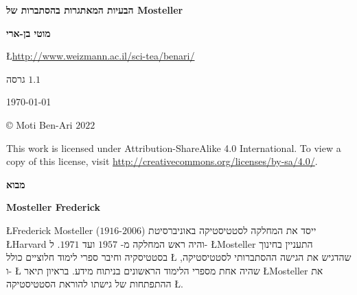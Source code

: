 


\thispagestyle{empty}

\begin{center}
\textbf{\LARGE הבעיות המאתגרות בהסתברות של Mosteller}

\bigskip
\bigskip
\bigskip

\textbf{\Large מוטי בן-ארי}

\bigskip

\L{\url{http://www.weizmann.ac.il/sci-tea/benari/}}

\bigskip
\bigskip
\bigskip

 גרסה
$1.1$

\bigskip

\today

\end{center}

\vfill

\begin{center}
\copyright{} Moti Ben-Ari $2022$
 \end{center}
 
\begin{small}
This work is licensed under Attribution-ShareAlike 4.0 International. To view a copy of this license, visit \url{http://creativecommons.org/licenses/by-sa/4.0/}.
\end{small}
\newpage


\tableofcontents

\newpage

\begin{center}
\textbf{\LARGE מבוא}
\end{center}


\bigskip

\textbf{Mosteller Frederick}

\L{Frederick Mosteller}
($1916$-$2006$)
ייסד את המחלקה לסטטיסטיקה באוניברסיטת 
\L{Harvard}
והיה ראש המחלקה מ-%
$1957$
ועד
$1971$.
ל-%
\L{Mosteller}
התעניין בחינוך בסטטיסקיה וחיבר ספרי לימוד חלוציים כולל 
\L{\cite{pwsa}}
שהדגיש את הגישה ההסתברותי לסטטיסטיקה, ו-%
\L{\cite{bsda}}
שהיה אחת מספרי הלימוד הראשונים בניתוח מידע. בראיון תיאר 
\L{Mosteller}
את ההתפתחות של גישתו להוראת הסטטיסטיקה
\L{\cite{gse}}.

